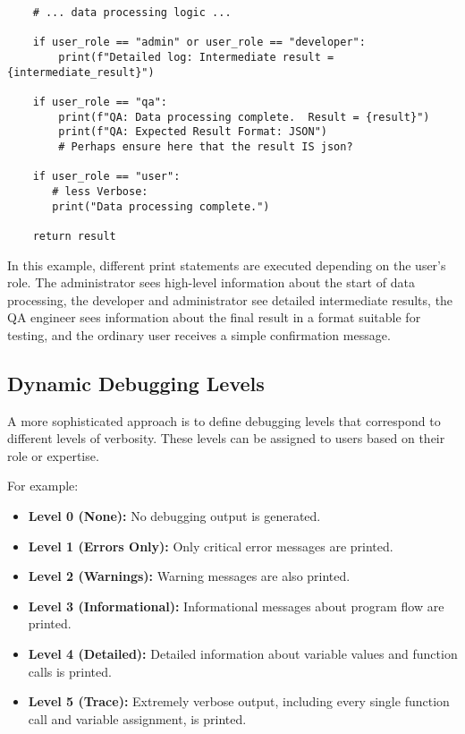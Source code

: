 \documentclass{article}
\begin{document}
{{{\begin{verbatim}
    # ... data processing logic ...

    if user_role == "admin" or user_role == "developer":
        print(f"Detailed log: Intermediate result = {intermediate_result}")

    if user_role == "qa":
        print(f"QA: Data processing complete.  Result = {result}")
        print(f"QA: Expected Result Format: JSON")
        # Perhaps ensure here that the result IS json?

    if user_role == "user":
       # less Verbose:
       print("Data processing complete.")

    return result
\end{verbatim}

In this example, different print statements are executed depending on the user's role.  The administrator sees high-level information about the start of data processing, the developer and administrator see detailed intermediate results, the QA engineer sees information about the final result in a format suitable for testing, and the ordinary user receives a simple confirmation message.

\subsection*{Dynamic Debugging Levels}

A more sophisticated approach is to define debugging levels that correspond to different levels of verbosity.  These levels can be assigned to users based on their role or expertise.

For example:

\begin{itemize}
    \item \textbf{Level 0 (None):}  No debugging output is generated.
    \item \textbf{Level 1 (Errors Only):} Only critical error messages are printed.
    \item \textbf{Level 2 (Warnings):}  Warning messages are also printed.
    \item \textbf{Level 3 (Informational):}  Informational messages about program flow are printed.
    \item \textbf{Level 4 (Detailed):}  Detailed information about variable values and function calls is printed.
    \item \textbf{Level 5 (Trace):}  Extremely verbose output, including every single function call and variable assignment, is printed.
\end{itemize}

}}}
\end{document}
